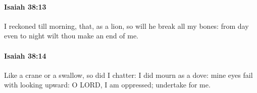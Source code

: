 		\paragraph{Isaiah 38:13} %
			\label{ISAIAH-38-13}

			I reckoned till morning, that, as a lion, so will he break all my bones: from day even to night wilt thou make an end of me.


		\paragraph{Isaiah 38:14} %
			\label{ISAIAH-38-14}

			Like a crane or a swallow, so did I chatter: I did mourn as a dove: mine eyes fail with looking upward: O LORD, I am oppressed; undertake for me.


